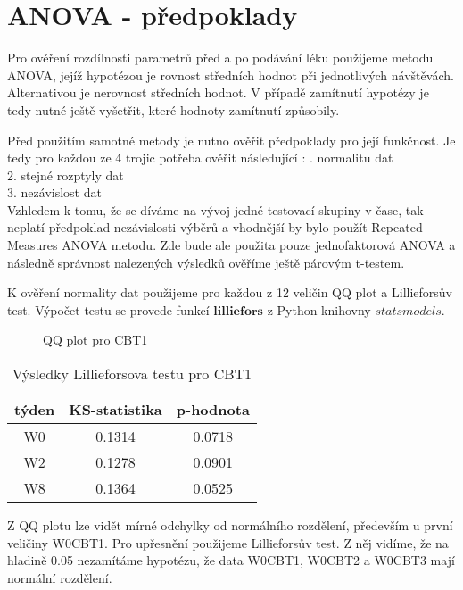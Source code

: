 \documentclass{article}
\begin{document}
\newpage

\section{ANOVA - předpoklady}
Pro ověření rozdílnosti parametrů před a po podávání léku použijeme metodu ANOVA, jejíž hypotézou je rovnost středních hodnot při jednotlivých návštěvách.
Alternativou je nerovnost středních hodnot. V případě zamítnutí hypotézy je tedy nutné ještě vyšetřit, které hodnoty zamítnutí způsobily.

Před použitím samotné metody je nutno ověřit předpoklady pro její funkčnost.
Je tedy pro každou ze 4 trojic potřeba ověřit následující :
. normalitu dat\\
2. stejné rozptyly dat\\ 
3. nezávislost dat\\

Vzhledem k tomu, že se díváme na vývoj jedné testovací skupiny v čase, tak neplatí předpoklad nezávislosti výběrů
a vhodnější by bylo použít Repeated Measures ANOVA metodu.
Zde bude ale použita pouze jednofaktorová ANOVA a následně správnost nalezených výsledků ověříme ještě párovým t-testem.

K ověření normality dat použijeme pro každou z 12 veličin QQ plot a Lillieforsův test.
Výpočet testu se provede funkcí $\mathbf{lilliefors}$ z Python knihovny $statsmodels$.


\begin{figure}[H]
  \centering
    
    \caption{QQ plot pro CBT1}
\end{figure}

\begin{table}[H]
  \small
  \centering
  \caption{Výsledky Lillieforsova testu pro CBT1}
  \begin{tabular}{|ccc|}
    \hline
    týden & KS-statistika & p-hodnota\\
    \hline
    W0 & 0.1314 & 0.0718\\
    W2 & 0.1278 & 0.0901\\
    W8 & 0.1364 & 0.0525\\
    \hline
  \end{tabular}
\end{table}

Z QQ plotu lze vidět mírné odchylky od normálního rozdělení, především u první veličiny W0CBT1.
Pro upřesnění použijeme Lillieforsův test. Z něj vidíme, že na hladině 0.05 nezamítáme hypotézu, že data W0CBT1, W0CBT2 a W0CBT3 mají normální rozdělení.
\end{document}
